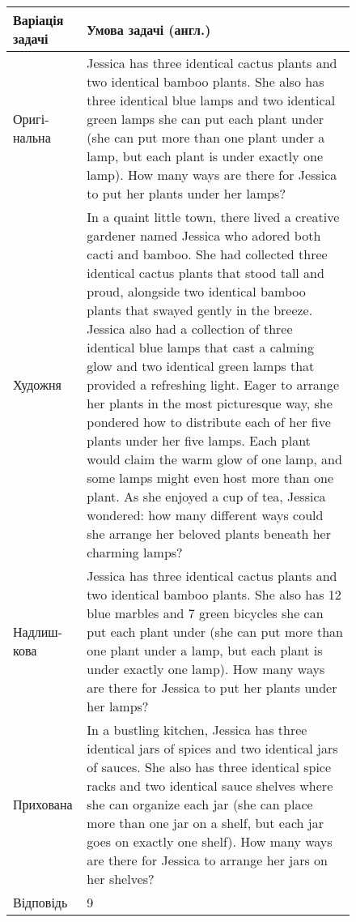 \begin{figure}[h!]
\centering
\small
{}
\label{tab:problem_example_153}
\begin{tabular}{|p{2cm}|p{14cm}|}
    \hline
    \textbf{Варіація задачі} & \textbf{Умова задачі (англ.)} \\
    \hline
    Оригі-нальна & Jessica has three identical cactus plants and two identical bamboo plants. She also has three identical blue lamps and two identical green lamps she can put each plant under (she can put more than one plant under a lamp, but each plant is under exactly one lamp). How many ways are there for Jessica to put her plants under her lamps? \\ \hline
    Художня & In a quaint little town, there lived a creative gardener named Jessica who adored both cacti and bamboo. She had collected three identical cactus plants that stood tall and proud, alongside two identical bamboo plants that swayed gently in the breeze. Jessica also had a collection of three identical blue lamps that cast a calming glow and two identical green lamps that provided a refreshing light. Eager to arrange her plants in the most picturesque way, she pondered how to distribute each of her five plants under her five lamps. Each plant would claim the warm glow of one lamp, and some lamps might even host more than one plant. As she enjoyed a cup of tea, Jessica wondered: how many different ways could she arrange her beloved plants beneath her charming lamps? \\ \hline
    Надлиш-кова & Jessica has three identical cactus plants and two identical bamboo plants. She also has 12 blue marbles and 7 green bicycles she can put each plant under (she can put more than one plant under a lamp, but each plant is under exactly one lamp). How many ways are there for Jessica to put her plants under her lamps? \\ \hline
    Прихована & In a bustling kitchen, Jessica has three identical jars of spices and two identical jars of sauces. She also has three identical spice racks and two identical sauce shelves where she can organize each jar (she can place more than one jar on a shelf, but each jar goes on exactly one shelf). How many ways are there for Jessica to arrange her jars on her shelves? \\ \hline
    Відповідь & 9 \\ \hline
\end{tabular}
\end{figure}

